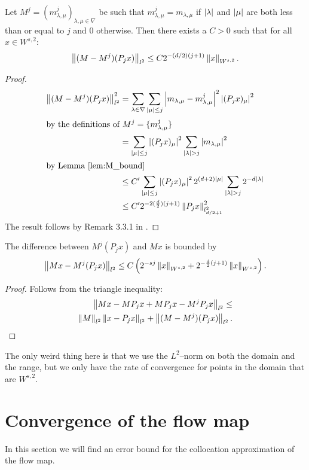 \begin{lemma} 
	Let $M^j=(m^j_{\lambda,\mu})_{\lambda,\mu \in \nabla}$ be such that $m^j_{\lambda,\mu} = m_{\lambda,\mu}$ if ${\lvert\lambda\rvert}$ and ${\lvert\mu\rvert}$ are both less than or equal to $j$ and $0$ otherwise. Then there exists a $C > 0$ such that for all $x \in W^{s,2}$:
	\begin{equation}
		\left\| (M-M^j)(P_jx) \right\|_{l^2} \leq C2^{-(d/2)(j+1)} \left\| x \right\|_{W^{s,2}}.
	\end{equation}
\end{lemma}
\begin{proof}
	\begin{align}
		\left\| (M-M^j)(P_j x) \right\|_{l^2}^2 &= \sum_{\lambda \in \nabla} \sum_{{\lvert\mu\rvert}\leq j} \left| m_{\lambda,\mu}-m^j_{\lambda,\mu} \right|^2 \left| (P_j x)_\mu \right|^2 \\
	\intertext{by the definitions of $M^j = \{ m_{\lambda,\mu}^j \}$ }
		&= \sum_{{\lvert\mu\rvert}\leq j}\left| (P_j x)_\mu \right|^2 \sum_{{\lvert\lambda\rvert}>j}\left| m_{\lambda,\mu} \right|^2 \\
	\intertext{by Lemma \ref{lem:M_bound}}
		&\leq C'\sum_{{\lvert\mu\rvert}\leq j}\left| (P_j x)_\mu \right|^2 2^{(d+2){\lvert\mu\rvert}}\sum_{{\lvert\lambda\rvert}>j}2^{-d{\lvert\lambda\rvert}} \\
		&\leq C' 2^{-2(\frac{d}{2})(j+1)}\left\| P_j x \right\|^2_{l^2_{d/2+1}}
	\end{align}
	The result follows by Remark 3.3.1 in \cite{Cohen2003}.
\end{proof}

\begin{corollary}
	The difference between $M^j (P_j x)$ and $M x$ is bounded by
	\[
		\left\| Mx - M^j(P_j x) \right\|_{l^2} \leq C \left( 2^{-sj}\left\| x \right\|_{W^{s,2}} + 2^{-\frac{d}{2}(j+1)}\left\| x \right\|_{W^{s,2}} \right).
	\]
\end{corollary}
\begin{proof}
	Follows from the triangle inequality:
	\begin{align*}
		\left\| Mx - M P_j x + M P_j x - M^j P_j x \right\|_{l^2} \leq \\
		 \left\| M \right\|_{l^2} \left\| x - P_j x \right\|_{l^2} + \left\| (M-M^j)(P_jx) \right\|_{l^2}.
	\end{align*}
\end{proof}

The only weird thing here is that we use the $L^2$--norm on both the domain and the range, but we only have the rate of convergence for points in the domain that are $W^{s,2}$.

\section{Convergence of the flow map}
In this section we will find an error bound for the collocation approximation of the flow map.

